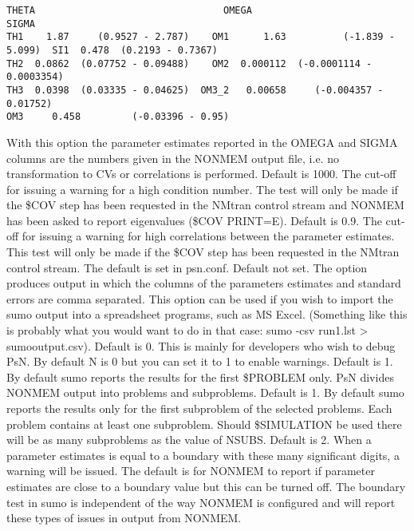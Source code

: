 \begin{optionlist}
\begin{verbatim}
THETA                                 OMEGA                                 SIGMA                     
TH1    1.87     (0.9527 - 2.787)    OM1      1.63          (-1.839 - 5.099)  SI1  0.478  (0.2193 - 0.7367)  
TH2  0.0862  (0.07752 - 0.09488)    OM2  0.000112  (-0.0001114 - 0.0003354)                                 
TH3  0.0398  (0.03335 - 0.04625)  OM3_2   0.00658     (-0.004357 - 0.01752)                                 
OM3     0.458         (-0.03396 - 0.95)
\end{verbatim}
With this option the parameter estimates reported in the OMEGA and SIGMA columns are the numbers given in the NONMEM output file, i.e. no transformation to CVs or correlations is performed. 
\nextopt
{}
Default is 1000. The cut-off for issuing a warning for a high condition number. The test will only be made if the \$COV step has been requested in the NMtran control stream and NONMEM has been asked to report eigenvalues (\$COV PRINT=E).
\nextopt
{}
Default is 0.9. The cut-off for issuing a warning for high correlations between the parameter estimates. This test will only be made if the \$COV step has been requested in the NMtran control stream. The default is set in psn.conf. 
\nextopt
{}
Default not set. The option produces output in which the columns of the parameters estimates and standard errors are comma separated. This option can be used if you wish to import the sumo output into a spreadsheet programs, such as MS Excel. (Something like this is probably what you would want to do in that case: sumo -csv run1.lst > sumooutput.csv). 
\nextopt
{}
Default is 0. This is mainly for developers who wish to debug PsN. By default N is 0 but you can set it to 1 to enable warnings.
\nextopt
{}
Default is 1. By default sumo reports the results for the first \$PROBLEM only. PsN divides NONMEM output into problems and subproblems.
\nextopt
{}
Default is 1. By default sumo reports the results only for the first subproblem of the selected problems. Each problem contains at least one subproblem. Should \$SIMULATION be used there will be as many subproblems as the value of NSUBS. 
\nextopt
\newpage
{}
Default is 2. When a parameter estimates is equal to a boundary with these many significant digits, a warning will be issued. The default is for NONMEM to report if parameter estimates are close to a boundary value but this can be turned off. The boundary test in sumo is independent of the way NONMEM is configured and will report these types of issues in output from NONMEM. 

\end{optionlist}
